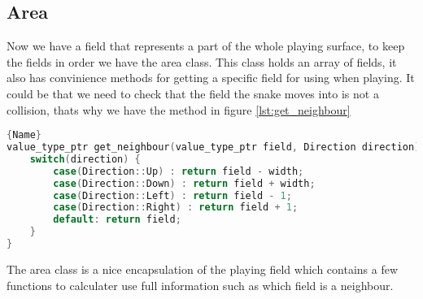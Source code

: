 \subsection{Area}

Now we have a field that represents a part of the whole playing surface, to keep the fields in order we have the area class.
This class holds an array of fields, it also has convinience methods for getting a specific field for using when playing.
It could be that we need to check that the field the snake moves into is not a collision, thats why we have the method in figure \ref{lst:get_neighbour}


\begin{lstlisting}[caption={Getting a neighbour field},label={lst:get_neighbour},frame=tlrb, language=C++]{Name}
value_type_ptr get_neighbour(value_type_ptr field, Direction direction) {
	switch(direction) {
		case(Direction::Up) : return field - width;
		case(Direction::Down) : return field + width;
		case(Direction::Left) : return field - 1;
		case(Direction::Right) : return field + 1;
		default: return field;
	}
}
\end{lstlisting}

The area class is a nice encapsulation of the playing field which contains a few functions to calculater use full information such as which field is a neighbour.
